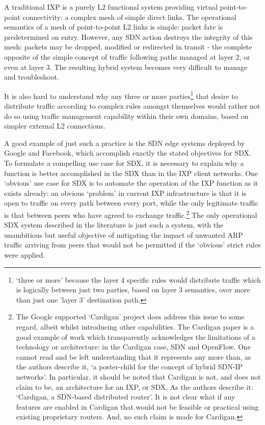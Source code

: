 A traditional IXP is a purely L2 functional system providing virtual point-to-point connectivity: a complex mesh of simple direct links.
The operational semantics of a mesh of point-to-point L2 links is simple: packet fate is predetermined on entry. However, any SDN action destroys the integrity of this mesh: packets may be dropped, modified or redirected in transit - the complete opposite of the simple concept of traffic following paths managed at layer 2, or even at layer 3. The resulting hybrid system becomes very difficult to manage and troubleshoot.

It is also hard to understand why any three or more parties\footnote{`three or more' because the layer 4 specific rules would distribute traffic which is logically between just two parties, based on layer 3 semantics, over more than just one 'layer 3' destination path.} that desire to distribute traffic according to complex rules amongst themselves would rather not do so using traffic management capability within their own domains, based on simpler external L2 connections.

A good example of just such a practice is the SDN edge systems deployed by Google and Facebook, which accomplish exactly the stated objectives for SDX.
To formulate a compelling use case for SDX, it is necessary to explain why a function is better accomplished in the SDX than in the IXP client networks.
One `obvious' use case for SDX is to automate the operation of the IXP function as it exists already: an obvious `problem' in current IXP infrastructure is that it is open to traffic on every path between every port, while the only legitimate traffic is that between peers who have agreed to exchange traffic.\footnote{The Google supported `Cardigan' project\cite{Stringer2014} does address this issue to some regard, albeit whilst introducing other capabilities.  The Cardigan paper is a good example of work which transparently acknowledges the limitations of a technology or architecture: in the Cardigan case, SDN and OpenFlow.  One cannot read \cite{Stringer2014} and be left understanding that it represents any more than, as the authors describe it, `a poster-child for the concept of hybrid SDN-IP networks'.  In particular, it should be noted that Cardigan is not, and does not claim to be, an architecture for an IXP, or SDX.  As the authors describe it: `Cardigan, a SDN-based distributed router'.  It is not clear what if any features are enabled in Cardigan that would not be feasible or practical using existing proprietary routers.  And, no such claim is made for Cardigan.}
The only operational SDX system described in the literature is just such a system, with the unambitious but useful objective of mitigating the impact of unwanted ARP traffic arriving from peers that would not be permitted if the `obvious' strict rules were applied.
